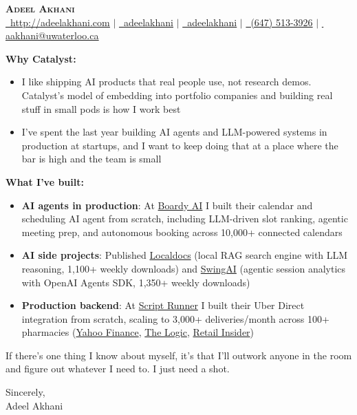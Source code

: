 \documentclass[letterpaper,11pt]{article}
\begin{document}
\begin{center}
    \textbf{\Huge \scshape Adeel Akhani} \\ \vspace{1pt}
    \small
    \href{http://adeelakhani.com/}{\faGlobe\, \underline{http://adeelakhani.com}} $|$
    \href{https://www.linkedin.com/in/adeelakhani/}{\faLinkedin\, \underline{adeelakhani}} $|$
    \href{https://github.com/adeelakhani}{\faGithub\, \underline{adeelakhani}} $|$
    \href{tel:(647) 513-3926}{\faMobile*\, (647) 513-3926} $|$
    \href{mailto:aakhani@uwaterloo.ca}{\faEnvelope\, \underline{aakhani@uwaterloo.ca}}
\end{center}

\vspace{15pt}

\noindent \textbf{Why Catalyst:}
\begin{itemize}[leftmargin=15pt]
    \item I like shipping AI products that real people use, not research demos. Catalyst's model of embedding into portfolio companies and building real stuff in small pods is how I work best
    \item I've spent the last year building AI agents and LLM-powered systems in production at startups, and I want to keep doing that at a place where the bar is high and the team is small
\end{itemize}

\vspace{4pt}
\noindent \textbf{What I've built:}
\begin{itemize}[leftmargin=15pt]
    \item \textbf{AI agents in production}: At \href{https://www.boardy.ai/}{Boardy AI} I built their calendar and scheduling AI agent from scratch, including LLM-driven slot ranking, agentic meeting prep, and autonomous booking across 10,000+ connected calendars
    \item \textbf{AI side projects}: Published \href{https://github.com/adeelakhani/localDocs}{Localdocs} (local RAG search engine with LLM reasoning, 1,100+ weekly downloads) and \href{https://www.npmjs.com/package/swing-sdk}{SwingAI} (agentic session analytics with OpenAI Agents SDK, 1,350+ weekly downloads)
    \item \textbf{Production backend}: At \href{https://scriptrunner.ai/}{Script Runner} I built their Uber Direct integration from scratch, scaling to 3,000+ deliveries/month across 100+ pharmacies (\href{https://ca.finance.yahoo.com/news/script-runner-uber-direct-partner-140000175.html}{Yahoo Finance}, \href{https://thelogic.co/briefing/prescription-delivery-platform-script-runner-inks-deal-to-use-ubers-route-planning-tech/}{The Logic}, \href{https://retail-insider.com/retail-insider/2025/10/script-runner-uber-direct-partner-on-rx-delivery/}{Retail Insider})
\end{itemize}

\vspace{6pt}
If there's one thing I know about myself, it's that I'll outwork anyone in the room and figure out whatever I need to. I just need a shot.

\vspace{10pt}

\noindent Sincerely, \\
Adeel Akhani
\end{document}

